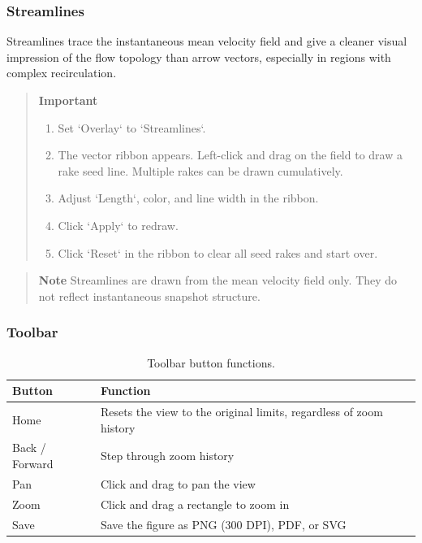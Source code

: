 \subsubsection{Streamlines}

Streamlines trace the instantaneous mean velocity field and give a cleaner visual impression of the flow topology than arrow vectors, especially in regions with complex recirculation.

\begin{quote}
\textbf{Important}
\begin{enumerate}[leftmargin=1.5em, topsep=2pt]
  \item Set `Overlay` to `Streamlines`.
  \item The vector ribbon appears. Left-click and drag on the field to draw a rake seed line. Multiple rakes can be drawn cumulatively.
  \item Adjust `Length`, color, and line width in the ribbon.
  \item Click `Apply` to redraw.
  \item Click `Reset` in the ribbon to clear all seed rakes and start over.
\end{enumerate}
\end{quote}

\begin{quote}
\textbf{Note}
Streamlines are drawn from the mean velocity field only. They do not reflect instantaneous snapshot structure.
\end{quote}

\subsubsection{Toolbar}

\begin{table}[htbp]
\centering
\caption{Toolbar button functions.}
\begin{tabular}{ll}
\toprule
\textbf{Button} & \textbf{Function} \\
\midrule
Home           & Resets the view to the original limits, regardless of zoom history \\
Back / Forward & Step through zoom history \\
Pan            & Click and drag to pan the view \\
Zoom           & Click and drag a rectangle to zoom in \\
Save           & Save the figure as PNG (300 DPI), PDF, or SVG \\
\bottomrule
\end{tabular}
\end{table}

